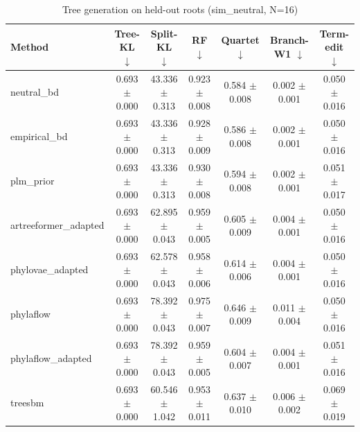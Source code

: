 \begin{table}[t]\centering
\caption{Tree generation on held-out roots (sim_neutral, N=16)}
\begin{tabular}{lcccccc}
\toprule
Method & Tree-KL $\downarrow$ & Split-KL $\downarrow$ & RF $\downarrow$ & Quartet $\downarrow$ & Branch-W1 $\downarrow$ & Term-edit $\downarrow$ \\
\midrule
neutral\_bd & 0.693 $\pm$ 0.000 & 43.336 $\pm$ 0.313 & 0.923 $\pm$ 0.008 & 0.584 $\pm$ 0.008 & 0.002 $\pm$ 0.001 & 0.050 $\pm$ 0.016 \\
empirical\_bd & 0.693 $\pm$ 0.000 & 43.336 $\pm$ 0.313 & 0.928 $\pm$ 0.009 & 0.586 $\pm$ 0.008 & 0.002 $\pm$ 0.001 & 0.050 $\pm$ 0.016 \\
plm\_prior & 0.693 $\pm$ 0.000 & 43.336 $\pm$ 0.313 & 0.930 $\pm$ 0.008 & 0.594 $\pm$ 0.008 & 0.002 $\pm$ 0.001 & 0.051 $\pm$ 0.017 \\
artreeformer\_adapted & 0.693 $\pm$ 0.000 & 62.895 $\pm$ 0.043 & 0.959 $\pm$ 0.005 & 0.605 $\pm$ 0.009 & 0.004 $\pm$ 0.001 & 0.050 $\pm$ 0.016 \\
phylovae\_adapted & 0.693 $\pm$ 0.000 & 62.578 $\pm$ 0.043 & 0.958 $\pm$ 0.006 & 0.614 $\pm$ 0.006 & 0.004 $\pm$ 0.001 & 0.050 $\pm$ 0.016 \\
phylaflow & 0.693 $\pm$ 0.000 & 78.392 $\pm$ 0.043 & 0.975 $\pm$ 0.007 & 0.646 $\pm$ 0.009 & 0.011 $\pm$ 0.004 & 0.050 $\pm$ 0.016 \\
phylaflow\_adapted & 0.693 $\pm$ 0.000 & 78.392 $\pm$ 0.043 & 0.959 $\pm$ 0.005 & 0.604 $\pm$ 0.007 & 0.004 $\pm$ 0.001 & 0.051 $\pm$ 0.016 \\
treesbm & 0.693 $\pm$ 0.000 & 60.546 $\pm$ 1.042 & 0.953 $\pm$ 0.011 & 0.637 $\pm$ 0.010 & 0.006 $\pm$ 0.002 & 0.069 $\pm$ 0.019 \\
\bottomrule
\end{tabular}
\end{table}